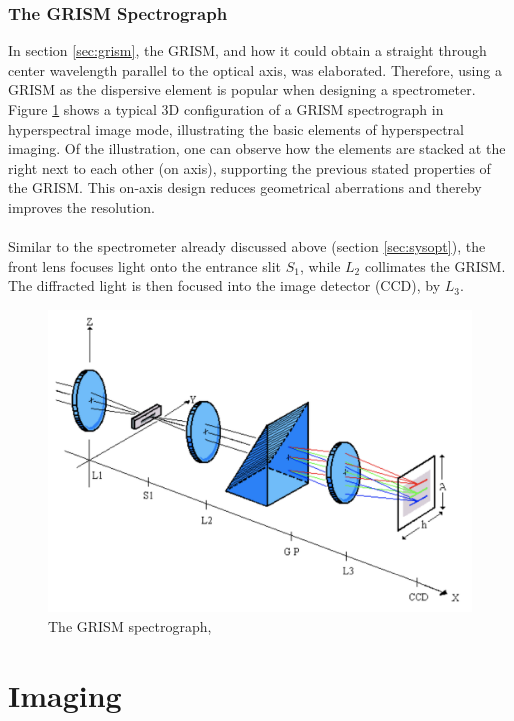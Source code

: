 \subsection{The GRISM Spectrograph}
In section \ref{sec:grism}, the GRISM, and how it could obtain a straight through center wavelength parallel to the optical axis, was elaborated. Therefore, using a GRISM as the dispersive element is popular when designing a spectrometer. Figure \ref{fig:grismspec} shows a typical 3D configuration of a GRISM spectrograph in hyperspectral image mode, illustrating the basic elements of hyperspectral imaging. Of the illustration, one can observe how the elements are stacked at the right next to each other (on axis), supporting the previous stated properties of the GRISM. This on-axis design reduces geometrical aberrations and thereby improves the resolution. 
\\\\
Similar to the spectrometer already discussed above (section \ref{sec:sysopt}), the front lens focuses light onto the entrance slit $S_1$, while $L_2$ collimates the GRISM. The diffracted light is then focused into the image detector (CCD), by $L_3$. 

\begin{figure}[H]
    \centering
    \includegraphics[width = 12cm]{Images/theory/grismspec.png}
    \caption[The GRISM Spectrograph]{The GRISM spectrograph, \cite{sigernes2018}}
    \label{fig:grismspec}
\end{figure}


\chapter{Imaging} %
\label{chap:theory2}

